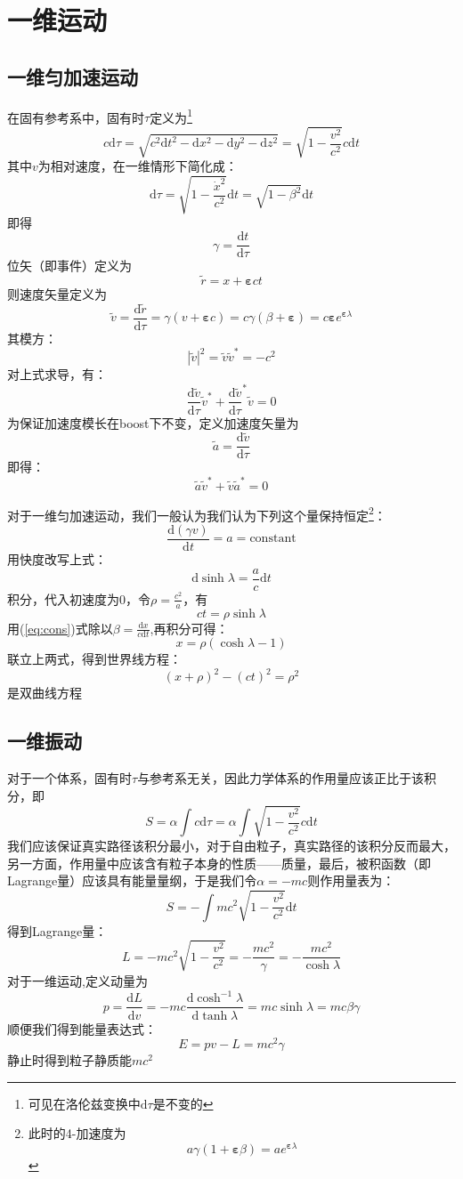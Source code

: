 \documentclass[hyperref,utf8]{ctexart}
\newcommand{\e}{\boldsymbol{\varepsilon}}
\begin{document}
\section{一维运动}
\subsection{一维匀加速运动}
在固有参考系中，固有时$\tau$定义为\footnote{可见在洛伦兹变换中$\mathrm{d}\tau$是不变的}
\[c\mathrm{d}\tau=\sqrt{c^2\mathrm{d}t^2-\mathrm{d}x^2-\mathrm{d}y^2-\mathrm{d}z^2}=\sqrt{1-\frac{v^2}{c^2}}c\mathrm{d}t\]
其中$v$为相对速度，在一维情形下简化成：\[\mathrm{d}\tau=\sqrt{1-\frac{\dot{x}^2}{c^2}}\mathrm{d}t=\sqrt{1-\beta^2}\mathrm{d}t\]
即得
\[\gamma=\frac{\mathrm{d}t}{\mathrm{d}\tau}\]
位矢（即事件）定义为
\[\tilde{r}=x+{\boldsymbol{\varepsilon}}ct\]
则速度矢量定义为\[\tilde{v}=\frac{\mathrm{d}\tilde{r}}{\mathrm{d}\tau}=\gamma(v+{\boldsymbol{\varepsilon}c})=c\gamma(\beta+{\boldsymbol{\varepsilon}})=c{\boldsymbol{\varepsilon}}e^{{\boldsymbol{\varepsilon}}\lambda}\]
其模方：\[|\tilde{v}|^2=\tilde{v}\tilde{v}^*=-c^2\]
对上式求导，有：\[\frac{\mathrm{d}\tilde{v}}{\mathrm{d}\tau}\tilde{v}^*+\frac{\mathrm{d}\tilde{v}}{\mathrm{d}\tau}^*\tilde{v}=0\]
为保证加速度模长在boost下不变，定义加速度矢量为\[\tilde{a}=\frac{\mathrm{d}\tilde{v}}{\mathrm{d}\tau}\]
即得：
\begin{equation}
    \tilde{a}\tilde{v}^*+\tilde{v}\tilde{a}^*=0 \label{eq:cdot}
\end{equation}

对于一维匀加速运动，我们一般认为我们认为下列这个量保持恒定\footnote{此时的4-加速度为\[a \gamma (1+\e \beta )=a e^{\e \lambda }\]}：
\begin{equation}
\frac{\mathrm{d}(\gamma v)}{\mathrm{d}t}=a=\mathrm{constant}\label{eq:cons}
\end{equation}
用快度改写上式：\[\mathrm{d}\sinh{\lambda}=\frac{a}{c}\mathrm{d}t\]
积分，代入初速度为$0$，令$\rho=\frac{c^2}{a}$，有\[ct=\rho \sinh{\lambda}\]
用(\ref{eq:cons})式除以$\beta=\frac{\mathrm{d}x}{c\mathrm{d}t}$,再积分可得：
\[x=\rho(\cosh{\lambda}-1)\]
联立上两式，得到世界线方程：
\[(x+\rho)^2-(ct)^2=\rho^2\]
是双曲线方程
\subsection{一维振动}
对于一个体系，固有时$\tau$与参考系无关，因此力学体系的作用量应该正比于该积分，即
\[S=\alpha\int c\mathrm{d}\tau=\alpha\int\sqrt{1-\frac{v^2}{c^2}}c\mathrm{d}t\]
我们应该保证真实路径该积分最小，对于自由粒子，真实路径的该积分反而最大，另一方面，作用量中应该含有粒子本身的性质——质量，最后，被积函数（即Lagrange量）应该具有能量量纲，于是我们令$\alpha=-mc$则作用量表为：\[S=-\int mc^2\sqrt{1-\frac{v^2}{c^2}}\mathrm{d}t\]
得到Lagrange量：\[L=-mc^2\sqrt{1-\frac{v^2}{c^2}}=-\frac{mc^2}{\gamma}=-\frac{mc^2}{\cosh{\lambda}}\]
对于一维运动,定义动量为\[p=\frac{\mathrm{d}L}{\mathrm{d}v}=-mc\frac{\mathrm{d}\cosh^{-1}{\lambda}}{\mathrm{d}\tanh{\lambda}}=mc\sinh{\lambda}=mc\beta\gamma\]
顺便我们得到能量表达式：\[E=pv-L=mc^2\gamma\]
静止时得到粒子静质能$mc^2$
\end{document}
